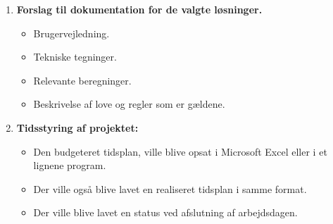 \begin{enumerate}
    \item \textbf{Forslag til dokumentation for de valgte løsninger.}
    \begin{itemize}
        \item Brugervejledning.
        \item Tekniske tegninger.
        \item Relevante beregninger.
        \item Beskrivelse af love og regler som er gældene.
    \end{itemize}
    \item \textbf{Tidsstyring af projektet:}
    \begin{itemize}
        \item Den budgeteret tidsplan, ville blive opsat i Microsoft Excel eller i et lignene program.
        \item Der ville også blive lavet en realiseret tidsplan i samme format.
        \item Der ville blive lavet en status ved afslutning af arbejdsdagen.
    \end{itemize}
   
\end{enumerate}